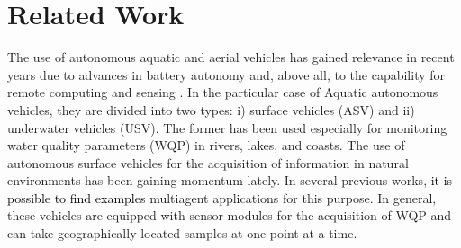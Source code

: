 \documentclass[journal]{IEEEtran}
\newcommand\changes[1]{\textcolor{black}{#1}}
\begin{document}
\section{Related Work}


The use of autonomous aquatic and aerial vehicles has gained relevance in recent years due to advances in battery autonomy and, above all, to the capability for remote computing and sensing \cite{sanchez-garcia_survey_2018}. In the particular case of Aquatic autonomous vehicles, they are divided into two types: i) surface vehicles (ASV) and ii) underwater vehicles (USV). The former has been used especially for monitoring water quality parameters (WQP) in rivers, lakes, and coasts. 
The use of autonomous surface vehicles for the acquisition of information in natural environments has been gaining momentum lately. In several previous works, \changes{it is possible to find examples} multiagent \cite{peralta_MULTIOBJECTIVE} applications for this purpose. In general, these vehicles are equipped with sensor modules for the acquisition of WQP and can take geographically located samples at one point at a time. 





\end{document}
